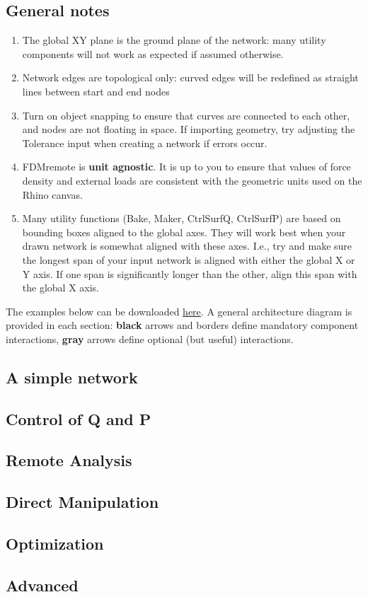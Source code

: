 \subsection{General notes}
\begin{enumerate}
    \item The global XY plane is the ground plane of the network: many utility components will not work as expected if assumed otherwise.
    \item Network edges are topological only: curved edges will be redefined as straight lines between start and end nodes
    \item Turn on object snapping to ensure that curves are connected to each other, and nodes are not floating in space. If importing geometry, try adjusting the Tolerance input when creating a network if errors occur.
    \item FDMremote is \textbf{unit agnostic}. It is up to you to ensure that values of force density and external loads are consistent with the geometric units used on the Rhino canvas.
    \item Many utility functions (Bake, Maker, CtrlSurfQ, CtrlSurfP) are based on bounding boxes aligned to the global axes. They will work best when your drawn network is somewhat aligned with these axes. I.e., try and make sure the longest span of your input network is aligned with either the global X or Y axis. If one span is significantly longer than the other, align this span with the global X axis.
\end{enumerate}

The examples below can be downloaded \href{https://www.food4rhino.com/en/app/fdmremote?lang=en}{here}. A general architecture diagram is provided in each section: \textbf{black} arrows and borders define mandatory component interactions, {\color{gray} \textbf{gray}} arrows define optional (but useful) interactions.

\subsection{A simple network}


\subsection{Control of Q and P}


\subsection{Remote Analysis}


\subsection{Direct Manipulation}


\subsection{Optimization}


\subsection{Advanced}